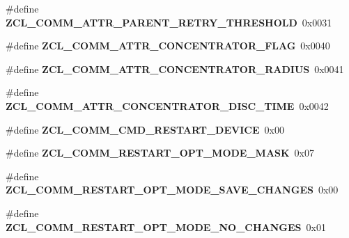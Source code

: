 \begin{DoxyCompactItemize}
\item 
\mbox{\label{group__zcl__commissioning_gad7e7b7d1a9f1102424c4a82679d48f77}} 
\#define {\bfseries Z\+C\+L\+\_\+\+C\+O\+M\+M\+\_\+\+A\+T\+T\+R\+\_\+\+P\+A\+R\+E\+N\+T\+\_\+\+R\+E\+T\+R\+Y\+\_\+\+T\+H\+R\+E\+S\+H\+O\+LD}~0x0031
\item 
\mbox{\label{group__zcl__commissioning_ga3d1ceb746a83fbc926d1c2a64719118f}} 
\#define {\bfseries Z\+C\+L\+\_\+\+C\+O\+M\+M\+\_\+\+A\+T\+T\+R\+\_\+\+C\+O\+N\+C\+E\+N\+T\+R\+A\+T\+O\+R\+\_\+\+F\+L\+AG}~0x0040
\item 
\mbox{\label{group__zcl__commissioning_ga081f4edeaf02e6acb2054e8159189583}} 
\#define {\bfseries Z\+C\+L\+\_\+\+C\+O\+M\+M\+\_\+\+A\+T\+T\+R\+\_\+\+C\+O\+N\+C\+E\+N\+T\+R\+A\+T\+O\+R\+\_\+\+R\+A\+D\+I\+US}~0x0041
\item 
\mbox{\label{group__zcl__commissioning_ga9501301017651a7119ed616c272c7b15}} 
\#define {\bfseries Z\+C\+L\+\_\+\+C\+O\+M\+M\+\_\+\+A\+T\+T\+R\+\_\+\+C\+O\+N\+C\+E\+N\+T\+R\+A\+T\+O\+R\+\_\+\+D\+I\+S\+C\+\_\+\+T\+I\+ME}~0x0042
\item 
\mbox{\label{group__zcl__commissioning_ga89b4de1f951e6ed93f14a4eddc5ecc01}} 
\#define {\bfseries Z\+C\+L\+\_\+\+C\+O\+M\+M\+\_\+\+C\+M\+D\+\_\+\+R\+E\+S\+T\+A\+R\+T\+\_\+\+D\+E\+V\+I\+CE}~0x00
\item 
\mbox{\label{group__zcl__commissioning_ga3ee979d4f3b6acea58c3c89a04aae67f}} 
\#define {\bfseries Z\+C\+L\+\_\+\+C\+O\+M\+M\+\_\+\+R\+E\+S\+T\+A\+R\+T\+\_\+\+O\+P\+T\+\_\+\+M\+O\+D\+E\+\_\+\+M\+A\+SK}~0x07
\item 
\mbox{\label{group__zcl__commissioning_ga49df6eb7433e8acc414f4b945fbc68e0}} 
\#define {\bfseries Z\+C\+L\+\_\+\+C\+O\+M\+M\+\_\+\+R\+E\+S\+T\+A\+R\+T\+\_\+\+O\+P\+T\+\_\+\+M\+O\+D\+E\+\_\+\+S\+A\+V\+E\+\_\+\+C\+H\+A\+N\+G\+ES}~0x00
\item 
\mbox{\label{group__zcl__commissioning_ga2243f4b499f9e3aeaa02d370a1e2e01c}} 
\#define {\bfseries Z\+C\+L\+\_\+\+C\+O\+M\+M\+\_\+\+R\+E\+S\+T\+A\+R\+T\+\_\+\+O\+P\+T\+\_\+\+M\+O\+D\+E\+\_\+\+N\+O\+\_\+\+C\+H\+A\+N\+G\+ES}~0x01

\end{DoxyCompactItemize}
